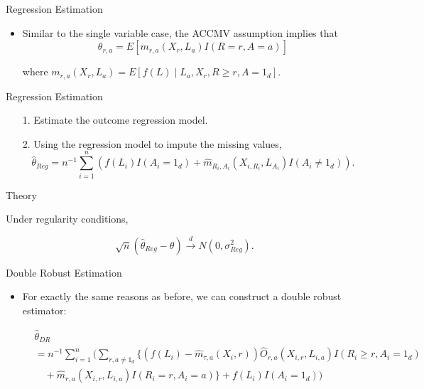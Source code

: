 \documentclass{beamer} %
\begin{document}
\begin{frame}{Regression Estimation}
  \begin{itemize}
    \item Similar to the single variable case, the ACCMV assumption implies that
      \[\theta_{r,a} = E[m_{r,a}(X_r, L_a)I(R = r, A = a)]\]

      where $m_{r,a}(X_r, L_a) = E[f(L) \mid L_a, X_r, R \geq r, A = 1_d]$.
  \end{itemize}
\end{frame}

\begin{frame}{Regression Estimation}
  \begin{itemize}
    \item[1.] Estimate the outcome regression model.
    \item[2.] Using the regression model to impute the missing values,
      \[\hat \theta_{Reg} = n^{-1} \sum_{i = 1}^n (f(L_i)I(A_i = 1_d) + 
        \hat m_{R_i,A_i}(X_{i, R_i}, L_{A_i})I(A_i \neq 1_d)).\]
  \end{itemize}
\end{frame}

\begin{frame}{Theory}
  \begin{theorem}
    Under regularity conditions,

    \[\sqrt n (\hat \theta_{Reg} - \theta) \stackrel{d}{\to} N(0, \sigma_{Reg}^2).\]
  \end{theorem}
\end{frame}

\begin{frame}{Double Robust Estimation}
  \begin{itemize}
    \item For exactly the same reasons as before, we can construct a double
      robust estimator:

      {\footnotesize
      \begin{align*}
        &\hat \theta_{DR} \\
        &= n^{-1} \sum_{i = 1}^n \Big(
          \sum_{r, a \neq 1_d} \{(f(L_i) - \hat m_{\tau, a}(X_i, r)) 
            \hat O_{r,a}(X_{i,r}, L_{i,a})I(R_i \geq r, A_i = 1_d) \\ 
        &\quad+ \hat m_{r,a}(X_{i,r}, L_{i,a})I(R_i = r, A_i = a)\} + f(L_i)I(A_i
        = 1_d) \Big)
      \end{align*}
      }
  \end{itemize}
\end{frame}
\end{document}
